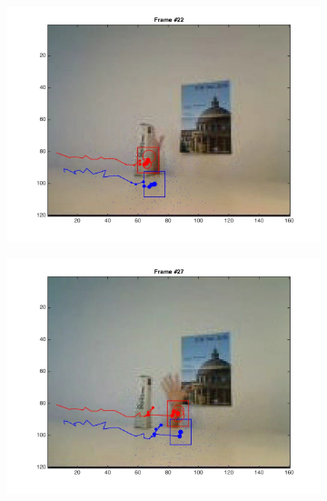 \documentclass{ethz_report}
\begin{document}
\begin{figure}[H]
\begin{subfigure}[b]{.25\textwidth}
        \includegraphics[width=1\linewidth]{images/video2_model_21}
    \end{subfigure}%
    \begin{subfigure}[b]{.25\textwidth}
        \centering
        \includegraphics[width=1\linewidth]{images/video2_model_26}
    \end{subfigure}%
    \begin{subfigure}[b]{.25\textwidth}
        \centering

\end{subfigure}
\end{figure}
\end{document}
